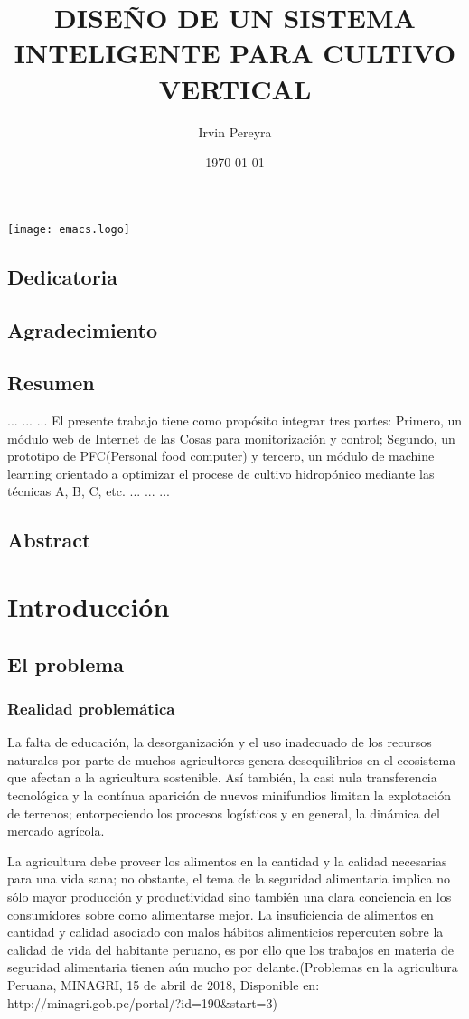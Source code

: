 \documentclass{report}
\title{DISEÑO DE UN SISTEMA INTELIGENTE PARA CULTIVO VERTICAL}
\author{Irvin Pereyra}
\date{\today}
\begin{document}
\maketitle
\texttt{[image: emacs.logo]}
\section{Dedicatoria}
\section{Agradecimiento}
\tableofcontents
\newpage
{}
\section{Resumen}
...
...
...
El presente trabajo tiene como propósito integrar tres partes: Primero, un
módulo web de Internet de las Cosas para monitorización y control; Segundo, un
prototipo de PFC(Personal food computer) y tercero, un módulo de machine
learning orientado a optimizar el procese de cultivo hidropónico mediante las
técnicas A, B, C, etc.
...
...
...
\section{Abstract}

\chapter{Introducción}
\section{El problema}
\subsection{Realidad problemática}
La falta de educación, la desorganización y el uso inadecuado de los recursos
naturales por parte de muchos agricultores genera desequilibrios en el
ecosistema que afectan a la agricultura sostenible. Así también, la casi nula
transferencia tecnológica y la contínua aparición de nuevos minifundios limitan
la explotación de terrenos; entorpeciendo los procesos logísticos y en general,
la dinámica del mercado agrícola.

La agricultura debe proveer los alimentos en la cantidad y la calidad necesarias
para una vida sana; no obstante, el tema de la seguridad alimentaria implica no
sólo mayor producción y productividad sino también una clara conciencia en los
consumidores sobre como alimentarse mejor. La insuficiencia de alimentos en
cantidad y calidad asociado con malos hábitos alimenticios repercuten sobre la
calidad de vida del habitante peruano, es por ello que los trabajos en materia
de seguridad alimentaria tienen aún mucho por delante.(Problemas en la
agricultura Peruana, MINAGRI, 15 de abril de 2018,  Disponible en:
http://minagri.gob.pe/portal/?id=190&start=3)
\end{document}
